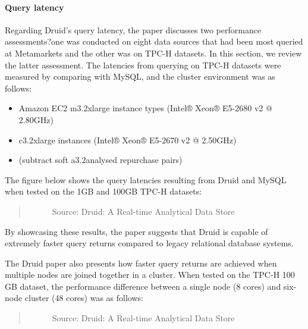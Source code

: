 \documentclass[letterpaper,10pt,english]{sphinxmanual}
\begin{document}
\paragraph{Query latency}
\label{\detokenize{discovery/part01/druid_tests:query-latency}}
Regarding Druid’s query latency, the paper discusses two performance assessments?one was conducted on eight data sources that had been most queried at Metamarkets and the other was on TPC-H datasets. In this section, we review the latter assessment. The latencies from querying on TPC-H datasets were measured by comparing with MySQL, and the cluster environment was as follows:
\begin{itemize}
\item {} 
 Amazon EC2 m3.2xlarge instance types (Intel® Xeon® E5-2680 v2 @ 2.80GHz)

\item {} 
 c3.2xlarge instances (Intel® Xeon® E5-2670 v2 @ 2.50GHz)

\item {} 
 (subtract soft a3.2analysed repurchase pairs)

\end{itemize}

The figure below shows the query latencies resulting from Druid and MySQL when tested on the 1GB and 100GB TPC-H datasets:
\begin{quote}

\begin{figure}[H]
\centering
\capstart

\noindent{}
\caption{Source: Druid: A Real-time Analytical Data Store}\label{\detokenize{discovery/part01/druid_tests:id12}}\end{figure}
\end{quote}

By showcasing these results, the paper suggests that Druid is capable of extremely faster query returns compared to legacy relational database systems.

The Druid paper also presents how faster query returns are achieved when multiple nodes are joined together in a cluster. When tested on the TPC-H 100 GB dataset, the performance difference between a single node (8 cores) and six-node cluster (48 cores) was as follows:
\begin{quote}

\begin{figure}[H]
\centering
\capstart

\noindent{}
\caption{Source: Druid: A Real-time Analytical Data Store}\label{\detokenize{discovery/part01/druid_tests:id13}}\end{figure}
\end{quote}
\end{document}
